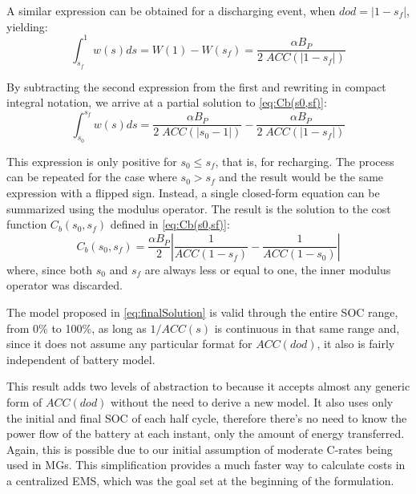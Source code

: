 \documentclass{ieeeaccess}
\begin{document}
    A similar expression can be obtained for a discharging event, when $dod=|1-s_{f}|$, yielding:
    \small
         $$ \int_{s_{f}}^{1}w(s)ds = W(1) - W(s_{f}) = \frac{\alpha B_{P}}{2 \; ACC(|1-s_{f}|)} $$
	\normalsize

    By subtracting the second expression from the first and rewriting in compact integral notation, we arrive at a partial solution to \eqref{eq:Cb(s0,sf)}:
    \small
       $$ \int_{s_{0}}^{s_{f}}w(s)ds = \frac{\alpha B_{P}}{2 \; ACC(|s_{0}-1|)} - \frac{\alpha B_{P}}{2 \; ACC(|1-s_{f}|)} $$
	\normalsize

    This expression is only positive for $s_{0} \le s_{f}$, that is, for recharging. The process can be repeated for the case where $s_{0} > s_{f}$ and the result would be the same expression with a flipped sign. Instead, a single closed-form equation can be summarized using the modulus operator. The result is the solution to the cost function $C_b(s_{0}, s_{f})$ defined in \eqref{eq:Cb(s0,sf)}:
    \small
    \begin{equation}
        C_b(s_{0}, s_{f}) = \frac{\alpha B_{P}}{2} \left| \frac{1}{ACC(1-s_{f})} - \frac{1}{ACC(1-s_{0})} \right|
        \label{eq:finalSolution}
    \end{equation}
	\normalsize
    where, since both $s_{0}$ and $s_{f}$ are always less or equal to one, the inner modulus operator was discarded.

    The model proposed in \eqref{eq:finalSolution} is valid through the entire \ac{SOC} range, from 0\% to 100\%, as long as $1/ACC(s)$ is continuous in that same range and, since it does not assume any particular format for $ACC(dod)$, it also is fairly independent of battery model.

    This result adds two levels of abstraction to \cite{HAN2014} because it accepts almost any generic form of $ACC(dod)$ without the need to derive a new model. It also uses only the initial and final \ac{SOC} of each half cycle, therefore there's no need to know the power flow of the battery at each instant, only the amount of energy transferred. Again, this is possible due to our initial assumption of moderate C-rates being used in \acp{MG}. This simplification provides a much faster way to calculate costs in a centralized \ac{EMS}, which was the goal set at the beginning of the formulation.
\end{document}
